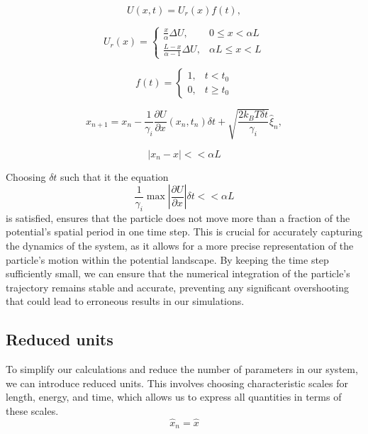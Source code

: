 \begin{equation}
    U(x,t) = U_r(x)f(t),
\end{equation}

\begin{equation}
    U_r(x) = \begin{cases}
        \frac{x}{\alpha}\Delta U, & 0 \leq x < \alpha L \\
        \frac{L - x}{\alpha - 1}\Delta U, & \alpha L \leq x < L
    \end{cases}
\end{equation}

\begin{equation}
    f(t) = \begin{cases}
        1, & t < t_0 \\
        0, & t \geq t_0
    \end{cases}
\end{equation}

\begin{equation}
    x_{n+1} = x_n - \frac{1}{{\gamma}_i} \frac{\partial U}{\partial x}(x_n, t_n) \delta t + \sqrt{\frac{2 k_B T \delta t}{{\gamma}_i}} \hat{\xi}_n,
\end{equation}

\begin{equation}
    \left\lvert{x_n - x}\right\rvert << \alpha L
\end{equation}


Choosing {$\delta t$} such that it the equation 
\begin{equation}
    \frac{1}{{\gamma}_i} \max \left\lvert{\frac{\partial U}{\partial x}}\right\rvert \delta t << \alpha L
\end{equation} 
is satisfied, ensures that the particle does not move more than a fraction of the potential's spatial period in one time step. This is crucial for accurately capturing the dynamics of the system, as it allows for a more precise representation of the particle's motion within the potential landscape. By keeping the time step sufficiently small, we can ensure that the numerical integration of the particle's trajectory remains stable and accurate, preventing any significant overshooting that could lead to erroneous results in our simulations.

\subsection{Reduced units}
To simplify our calculations and reduce the number of parameters in our system, we can introduce reduced units. This involves choosing characteristic scales for length, energy, and time, which allows us to express all quantities in terms of these scales.
\begin{equation}
    \hat{x}_n = \hat{x} 
\end{equation}

